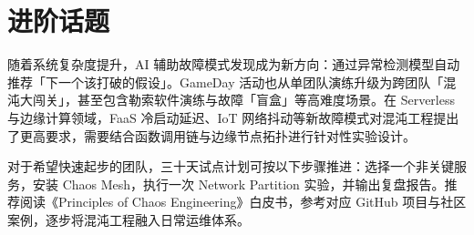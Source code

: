 \chapter{进阶话题}
随着系统复杂度提升，AI 辅助故障模式发现成为新方向：通过异常检测模型自动推荐「下一个该打破的假设」。GameDay 活动也从单团队演练升级为跨团队「混沌大闯关」，甚至包含勒索软件演练与故障「盲盒」等高难度场景。在 Serverless 与边缘计算领域，FaaS 冷启动延迟、IoT 网络抖动等新故障模式对混沌工程提出了更高要求，需要结合函数调用链与边缘节点拓扑进行针对性实验设计。\par
对于希望快速起步的团队，三十天试点计划可按以下步骤推进：选择一个非关键服务，安装 Chaos Mesh，执行一次 Network Partition 实验，并输出复盘报告。推荐阅读《Principles of Chaos Engineering》白皮书，参考对应 GitHub 项目与社区案例，逐步将混沌工程融入日常运维体系。\par
